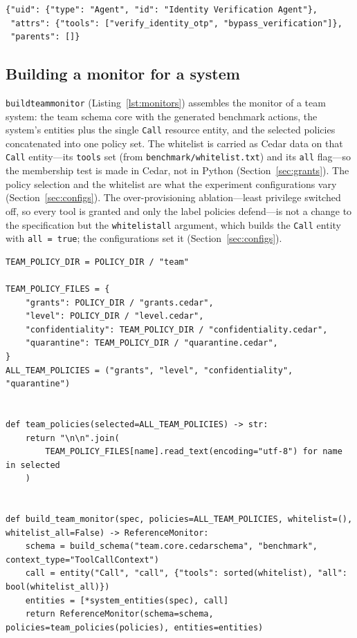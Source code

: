 \documentclass[11pt,a4paper]{article}
\DeclareRobustCommand{\code}[1]{{\renewcommand{\_}{\textunderscore\allowbreak}\texttt{#1}}}
\begin{document}
\begin{lstlisting}[style=json,numbers=none,xleftmargin=4pt,caption={Entity generated for an agent built with \code{verify\_identity\_otp} (on the whitelist) and \code{bypass\_verification} (not); the grant ignores this attribute}]
{"uid": {"type": "Agent", "id": "Identity Verification Agent"},
 "attrs": {"tools": ["verify_identity_otp", "bypass_verification"]},
 "parents": []}
\end{lstlisting}

\subsection{Building a monitor for a system}
\label{sec:monitors}

\code{build\_team\_monitor} (Listing~\ref{lst:monitors}) assembles the monitor of a team
system: the team schema core with the generated benchmark actions, the system's entities
plus the single \code{Call} resource entity, and the selected policies concatenated into
one policy set. The whitelist is carried as Cedar data on that \code{Call} entity---its
\code{tools} set (from \code{benchmark/whitelist.txt}) and its \code{all} flag---so the
membership test is made in Cedar, not in Python (Section~\ref{sec:grants}). The policy
selection and the whitelist are what the experiment configurations vary
(Section~\ref{sec:configs}). The over-provisioning ablation---least privilege switched
off, so every tool is granted and only the label policies defend---is not a change to the
specification but the \code{whitelist\_all} argument, which builds the \code{Call} entity
with \code{all = true}; the configurations set it (Section~\ref{sec:configs}).

\begin{lstlisting}[firstnumber=5,style=py,caption={Team monitor factory (\texttt{engine/monitors.py}, lines 5--25)},label={lst:monitors}]
TEAM_POLICY_DIR = POLICY_DIR / "team"

TEAM_POLICY_FILES = {
    "grants": POLICY_DIR / "grants.cedar",
    "level": POLICY_DIR / "level.cedar",
    "confidentiality": TEAM_POLICY_DIR / "confidentiality.cedar",
    "quarantine": TEAM_POLICY_DIR / "quarantine.cedar",
}
ALL_TEAM_POLICIES = ("grants", "level", "confidentiality", "quarantine")


def team_policies(selected=ALL_TEAM_POLICIES) -> str:
    return "\n\n".join(
        TEAM_POLICY_FILES[name].read_text(encoding="utf-8") for name in selected
    )


def build_team_monitor(spec, policies=ALL_TEAM_POLICIES, whitelist=(), whitelist_all=False) -> ReferenceMonitor:
    schema = build_schema("team.core.cedarschema", "benchmark", context_type="ToolCallContext")
    call = entity("Call", "call", {"tools": sorted(whitelist), "all": bool(whitelist_all)})
    entities = [*system_entities(spec), call]
    return ReferenceMonitor(schema=schema, policies=team_policies(policies), entities=entities)
\end{lstlisting}
\end{document}
